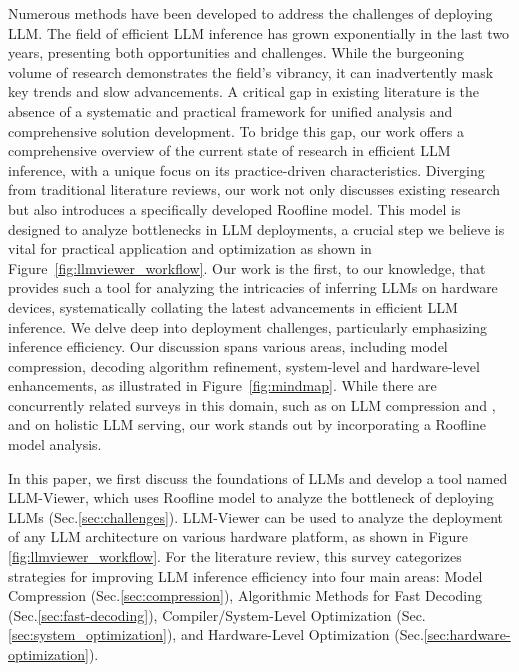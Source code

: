 Numerous methods have been developed to address the challenges of deploying LLM. The field of efficient LLM inference has grown exponentially in the last two years, presenting both opportunities and challenges. 
While the burgeoning volume of research demonstrates the field's vibrancy, it can inadvertently mask key trends and slow advancements. 
A critical gap in existing literature is the absence of a systematic and practical framework for unified analysis and comprehensive solution development.
To bridge this gap, our work offers a comprehensive overview of the current state of research in efficient LLM inference, with a unique focus on its practice-driven characteristics. Diverging from traditional literature reviews, our work not only discusses existing research but also introduces a specifically developed Roofline model. This model is designed to analyze bottlenecks in LLM deployments, a crucial step we believe is vital for practical application and optimization as shown in Figure~\ref{fig:llmviewer_workflow}.
Our work is the first, to our knowledge, that provides such a tool for analyzing the intricacies of inferring LLMs on hardware devices, systematically collating the latest advancements in efficient LLM inference. We delve deep into deployment challenges, particularly emphasizing inference efficiency. Our discussion spans various areas, including model compression, decoding algorithm refinement, system-level and hardware-level enhancements, as illustrated in Figure~\ref{fig:mindmap}.
While there are concurrently related surveys in this domain, such as \citep{zhu2023survey} on LLM compression and \citep{miao2023towards}, \citep{ding2023efficiency} and \citep{wang2024model} on holistic LLM serving, our work stands out by incorporating a Roofline model analysis. 

In this paper, we first discuss the foundations of LLMs and develop a tool named LLM-Viewer, which uses Roofline model to analyze the bottleneck of deploying LLMs (Sec.\ref{sec:challenges}). 
LLM-Viewer can be used to analyze the deployment of any LLM architecture on various hardware platform, as shown in Figure \ref{fig:llmviewer_workflow}. 
For the literature review, this survey categorizes strategies for improving LLM inference efficiency into four main areas: Model Compression (Sec.\ref{sec:compression}), Algorithmic Methods for Fast Decoding (Sec.\ref{sec:fast-decoding}), Compiler/System-Level Optimization (Sec.\ref{sec:system_optimization}), and Hardware-Level Optimization (Sec.\ref{sec:hardware-optimization}).


